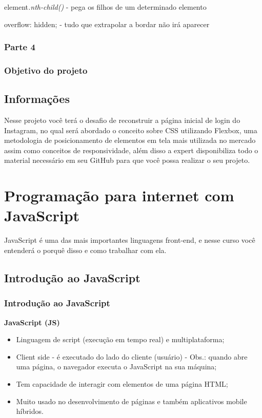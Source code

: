 \documentclass[12pt,a4paper]{article}
\begin{document}
	element\textit{.nth-child()} - pega os filhos de um determinado elemento
	
	overflow: hidden; - tudo que extrapolar a bordar não irá aparecer
	
	\subsubsection{Parte 4}
	
	\subsubsection{Objetivo do projeto}
	
	
	\subsection{Informações}
	
	Nesse projeto você terá o desafio de reconstruir a página inicial de login do Instagram, no qual será abordado o conceito sobre CSS utilizando Flexbox, uma metodologia de posicionamento de elementos em tela mais utilizada no mercado assim como conceitos de responsividade, além disso a expert disponibiliza todo o material necessário em seu GitHub para que você possa realizar o seu projeto.
	
	\section{Programação para internet com JavaScript}
	
	JavaScript é uma das mais importantes linguagens front-end, e nesse curso você entenderá o porquê disso e como trabalhar com ela.
	
	\subsection{Introdução ao JavaScript}
	\subsubsection{Introdução ao JavaScript}
	
	\textbf{JavaScript (JS)}
	
	\begin{itemize}
		\item Linguagem de script (execução em tempo real) e multiplataforma;
		\item Client side - é executado do lado do cliente (usuário) - Obs.: quando abre uma página, o navegador executa o JavaScript na sua máquina;
		\item Tem capacidade de interagir com elementos de uma página HTML;
		\item Muito usado no desenvolvimento de páginas e também aplicativos mobile híbridos.
	\end{itemize}
\end{document}
